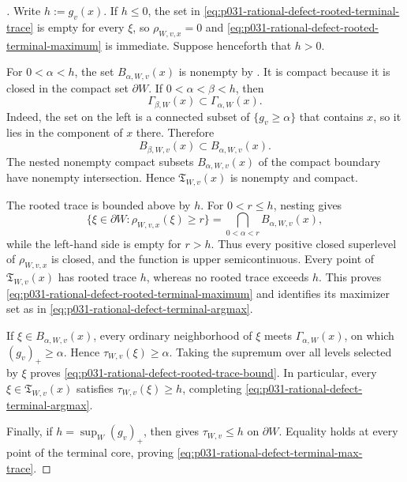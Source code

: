 
\begin{proof}[]
Write $h:=g_v(x)$.  If $h\leq0$, the set in
\eqref{eq:p031-rational-defect-rooted-terminal-trace} is empty for every
$\xi$, so $\rho_{W,v,x}=0$ and
\eqref{eq:p031-rational-defect-rooted-terminal-maximum} is immediate.
Suppose henceforth that $h>0$.

For $0<\alpha<h$, the set
$B_{\alpha,W,v}(x)$ is nonempty by
.  It is compact because it
is closed in the compact set $\partial W$.  If
$0<\alpha<\beta<h$, then
\[
 \Gamma_{\beta,W}(x)\subset\Gamma_{\alpha,W}(x).
\]
Indeed, the set on the left is a connected subset of
$\{g_v\geq\alpha\}$ that contains $x$, so it lies in the component of $x$
there.  Therefore
\begin{equation}
\label{eq:p031-rational-defect-rooted-contact-nesting}
             B_{\beta,W,v}(x)\subset B_{\alpha,W,v}(x).
\end{equation}
The nested nonempty compact subsets $B_{\alpha,W,v}(x)$ of the compact
boundary have nonempty intersection.  Hence
$\mathfrak T_{W,v}(x)$ is nonempty and compact.

The rooted trace is bounded above by $h$.  For $0<r\leq h$, nesting gives
\begin{equation}
\label{eq:p031-rational-defect-rooted-trace-superlevel}
 \{\xi\in\partial W:\rho_{W,v,x}(\xi)\geq r\}
   =\bigcap_{0<\alpha<r}B_{\alpha,W,v}(x),
\end{equation}
while the left-hand side is empty for $r>h$.  Thus every positive closed
superlevel of $\rho_{W,v,x}$ is closed, and the function is upper
semicontinuous.  Every point of $\mathfrak T_{W,v}(x)$ has rooted trace
$h$, whereas no rooted trace exceeds $h$.  This proves
\eqref{eq:p031-rational-defect-rooted-terminal-maximum} and identifies its
maximizer set as in
\eqref{eq:p031-rational-defect-terminal-argmax}.

If $\xi\in B_{\alpha,W,v}(x)$, every ordinary neighborhood of $\xi$ meets
$\Gamma_{\alpha,W}(x)$, on which $(g_v)_+\geq\alpha$.  Hence
$\tau_{W,v}(\xi)\geq\alpha$.  Taking the supremum over all levels selected
by $\xi$ proves
\eqref{eq:p031-rational-defect-rooted-trace-bound}.  In particular, every
$\xi\in\mathfrak T_{W,v}(x)$ satisfies
$\tau_{W,v}(\xi)\geq h$, completing
\eqref{eq:p031-rational-defect-terminal-argmax}.

Finally, if $h=\sup_W(g_v)_+$, then
 gives
$\tau_{W,v}\leq h$ on $\partial W$.  Equality holds at every point of the
terminal core, proving
\eqref{eq:p031-rational-defect-terminal-max-trace}.
\end{proof}

